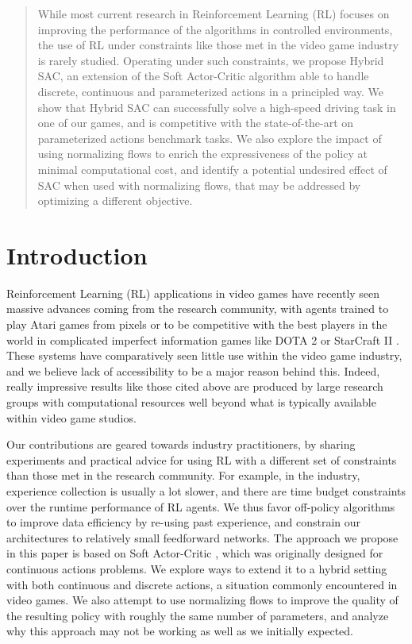 \documentclass[letterpaper]{article} \usepackage{aaai20}  \usepackage{times}  \usepackage{helvet} \usepackage{courier}  \usepackage[hyphens]{url}  \usepackage{graphicx} \urlstyle{rm} \def\UrlFont{\rm}  \usepackage{graphicx}  \usepackage[section]{placeins}
\author{Olivier Delalleau\textsuperscript{*}\textsuperscript{\rm 1}, Maxim Peter\textsuperscript{*}, Eloi Alonso, Adrien Logut\\ Ubisoft La Forge }
\begin{document}
\maketitle

\begin{abstract}
While most current research in Reinforcement Learning (RL) focuses on improving the performance of the algorithms in controlled environments, the use of RL under constraints like those met in the video game industry is rarely studied. Operating under such constraints, we propose Hybrid SAC, an extension of the Soft Actor-Critic algorithm able to handle discrete, continuous and parameterized actions in a principled way. We show that Hybrid SAC can successfully solve a high-speed driving task in one of our games, and is competitive with the state-of-the-art on parameterized actions benchmark tasks. We also explore the impact of using normalizing flows to enrich the expressiveness of the policy at minimal computational cost, and identify a potential undesired effect of SAC when used with normalizing flows, that may be addressed by optimizing a different objective.
\end{abstract}

\section{Introduction}

Reinforcement Learning (RL) applications in video games have recently seen massive advances coming from the research community, with agents trained to play Atari games from pixels \cite{mnih2015human} or to be competitive with the best players in the world in complicated imperfect information games like DOTA 2 \cite{openaifive} or StarCraft II \cite{alphastarblog,vinyals2019grandmaster}. These systems have comparatively seen little use within the video game industry, and we believe lack of accessibility to be a major reason behind this. Indeed, really impressive results like those cited above are produced by large research groups with computational resources well beyond what is typically available within video game studios.

Our contributions are geared towards industry practitioners, by sharing experiments and practical advice for using RL with a different set of constraints than those met in the research community. For example, in the industry, experience collection is usually a lot slower, and there are time budget constraints over the runtime performance of RL agents. We thus favor off-policy algorithms to improve data efficiency by re-using past experience, and constrain our architectures to relatively small feedforward networks. The approach we propose in this paper is based on Soft Actor-Critic \cite{haarnoja2018soft}, which was originally designed for continuous actions problems. We explore ways to extend it to a hybrid setting with both continuous and discrete actions, a situation commonly encountered in video games. We also attempt to use normalizing flows \cite{normalizingflows2015} to improve the quality of the resulting policy with roughly the same number of parameters, and analyze why this approach may not be working as well as we initially expected. 
\end{document}
